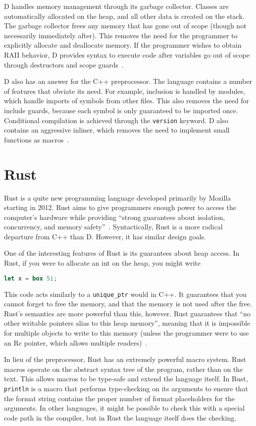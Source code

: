 \documentclass[finalcopy,short]{srpaper}
\begin{document}
D handles memory management through its garbage collector. Classes are
automatically allocated on the heap, and all other data is created on the
stack. The garbage collector frees any memory that has gone out of scope
(though not necessarily immediately after). This removes the need for the
programmer to explicitly allocate and deallocate memory. If the programmer
wishes to obtain RAII behavior, D provides syntax to execute code after
variables go out of scope through destructors and scope guards~\cite{cppford}.

D also has an answer for the C++ preprocessor. The language contains a number
of features that obviate its need. For example, inclusion is handled by
modules, which handle imports of symbols from other files. This also removes
the need for include guards, because each symbol is only guaranteed to be
imported once. Conditional compilation is achieved through the
\texttt{version} keyword. D also contains an aggressive inliner, which removes
the need to implement small functions as macros~\cite{pretod}.

\section{Rust}

Rust is a quite new programming language developed primarily by Mozilla
starting in 2012. Rust aims to give programmers enough power to access the
computer's hardware while providing ``strong guarantees about isolation,
concurrency, and memory safety''~\cite{Matsakis:2014:RL:2663171.2663188}.
Syntactically, Rust is a more radical departure from C++ than D. However, it
has similar design goals.

One of the interesting features of Rust is its guarantees about heap access.
In Rust, if you were to allocate an int on the heap, you might write

\begin{lstlisting}[language=Rust]
    let x = box 5i;
\end{lstlisting}

This code acts similarly to a \texttt{unique\_ptr} would in C++. It guarantees
that you cannot forget to free the memory, and that the memory is not used
after the free. Rust's semantics are more powerful than this, however. Rust
guarantees that ``no other writable pointers alias to this heap memory'',
meaning that it is impossible for multiple objects to write to this memory
(unless the programmer were to use an Rc pointer, which allows multiple
readers)~\cite{RustPointerGuide}.

In lieu of the preprocessor, Rust has an extremely powerful macro system.
Rust macros operate on the abstract syntax tree of the program, rather than on
the text. This allows macros to be type-safe and extend the language itself.
In Rust, \texttt{println} is a macro that performs type-checking on its
arguments to ensure that the format string contains the proper number of
format placeholders for the arguments. In other languages, it might be
possible to check this with a special code path in the compiler, but in Rust
the language itself does the checking.

\nocite{*}

\end{document}
